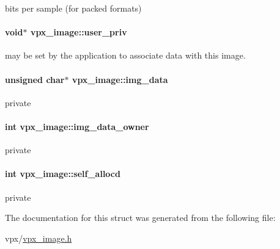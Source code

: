 bits per sample (for packed formats) \hypertarget{structvpx__image_a28ae6c046dfca87de4fca4e67cab563d}{
\paragraph[{user\+\_\+priv}]{\setlength{\rightskip}{0pt plus 5cm}void$\ast$ vpx\+\_\+image\+::user\+\_\+priv}}\label{structvpx__image_a28ae6c046dfca87de4fca4e67cab563d}
may be set by the application to associate data with this image. \hypertarget{structvpx__image_a3c9b7a7a68e4a9665b47433a1e96d78b}{
\paragraph[{img\+\_\+data}]{\setlength{\rightskip}{0pt plus 5cm}unsigned char$\ast$ vpx\+\_\+image\+::img\+\_\+data}}\label{structvpx__image_a3c9b7a7a68e4a9665b47433a1e96d78b}
private \hypertarget{structvpx__image_a4d2c8d41b67f7d3f3114212a8d8afdce}{
\paragraph[{img\+\_\+data\+\_\+owner}]{\setlength{\rightskip}{0pt plus 5cm}int vpx\+\_\+image\+::img\+\_\+data\+\_\+owner}}\label{structvpx__image_a4d2c8d41b67f7d3f3114212a8d8afdce}
private \hypertarget{structvpx__image_a33e8c75d8efc5d4f389e8fc09283a4cc}{
\paragraph[{self\+\_\+allocd}]{\setlength{\rightskip}{0pt plus 5cm}int vpx\+\_\+image\+::self\+\_\+allocd}}\label{structvpx__image_a33e8c75d8efc5d4f389e8fc09283a4cc}
private 

The documentation for this struct was generated from the following file\+:\begin{DoxyCompactItemize}
\item 
vpx/\hyperlink{vpx__image_8h}{vpx\+\_\+image.\+h}\end{DoxyCompactItemize}
